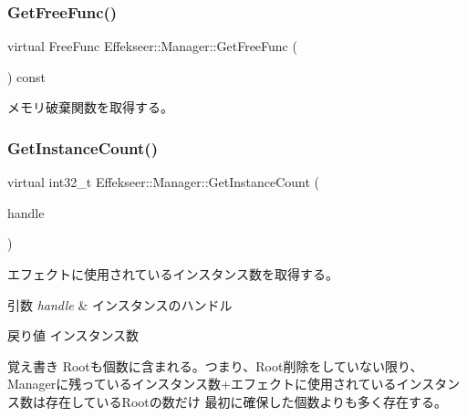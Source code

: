 \subsubsection{\texorpdfstring{Get\+Free\+Func()}{GetFreeFunc()}}
{\footnotesize\ttfamily virtual Free\+Func Effekseer\+::\+Manager\+::\+Get\+Free\+Func (\begin{DoxyParamCaption}{ }\end{DoxyParamCaption}) const\hspace{0.3cm}{\ttfamily [pure virtual]}}



メモリ破棄関数を取得する。 

\mbox{\label{class_effekseer_1_1_manager_a4e4831b6514c683cd9cabf5cfe1103ab}} 
\subsubsection{\texorpdfstring{Get\+Instance\+Count()}{GetInstanceCount()}}
{\footnotesize\ttfamily virtual int32\+\_\+t Effekseer\+::\+Manager\+::\+Get\+Instance\+Count (\begin{DoxyParamCaption}\item[{\mbox{\hyperlink{namespace_effekseer_afba58b8d812da862190e9bbfc040824a}{Handle}}}]{handle }\end{DoxyParamCaption})\hspace{0.3cm}{\ttfamily [pure virtual]}}



エフェクトに使用されているインスタンス数を取得する。 


\begin{DoxyParams}{引数}
{\em handle} & インスタンスのハンドル \\
\hline
\end{DoxyParams}
\begin{DoxyReturn}{戻り値}
インスタンス数 
\end{DoxyReturn}
\begin{DoxyNote}{覚え書き}
Rootも個数に含まれる。つまり、\+Root削除をしていない限り、 Managerに残っているインスタンス数+エフェクトに使用されているインスタンス数は存在している\+Rootの数だけ 最初に確保した個数よりも多く存在する。 
\end{DoxyNote}
\mbox{\label{class_effekseer_1_1_manager_adef5e990faa38e39b9aa57f03f485747}} 
